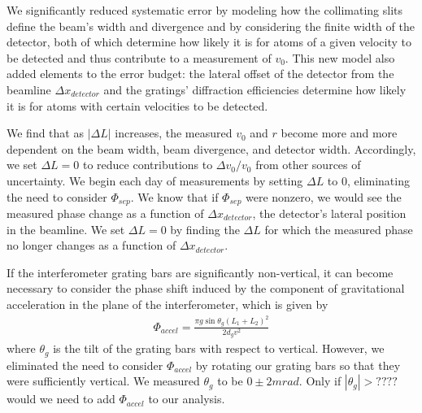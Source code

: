 \documentclass[twocolumn, prl,showpacs,superscriptaddress]{revtex4-1}   %
\begin{document}
We significantly reduced systematic error by modeling how the collimating slits define the beam's width and divergence and by considering the finite width of the detector, both of which determine how likely it is for atoms of a given velocity to be detected and thus contribute to a measurement of $v_0$. This new model also added elements to the error budget: the lateral offset of the detector from the beamline $\Delta x_{detector}$ and the gratings' diffraction efficiencies determine how likely it is for atoms with certain velocities to be detected.

We find that as $\left|\Delta L\right|$ increases, the measured $v_0$ and $r$ become more and more dependent on the beam width, beam divergence, and detector width. Accordingly, we set $\Delta L = 0$ to reduce contributions to $\Delta v_0/v_0$ from other sources of uncertainty. We begin each day of measurements by setting $\Delta L$ to 0, eliminating the need to consider $\Phi_{sep}$. We know that if $\Phi_{sep}$ were nonzero, we would see the measured phase change as a function of $\Delta x_{detector}$, the detector's lateral position in the beamline. We set $\Delta L = 0$ by finding the $\Delta L$ for which the measured phase no longer changes as a function of $\Delta x_{detector}$.


If the interferometer grating bars are significantly non-vertical, it can become necessary to consider the phase shift induced by the component of gravitational acceleration in the plane of the interferometer, which is given by
\begin{align}
	\Phi_{accel} = \frac{\pi g\sin{\theta_g}(L_1+L_2)^2}{2d_g v^2}
	\label{phiAccel}
\end{align}
where $\theta_g$ is the tilt of the grating bars with respect to vertical. However, we eliminated the need to consider $\Phi_{accel}$ by rotating our grating bars so that they were sufficiently vertical. We measured $\theta_g$ to be $0 \pm 2 mrad$. Only if $|\theta_g| > ????$ would we need to add $\Phi_{accel}$ to our analysis.
\end{document}
